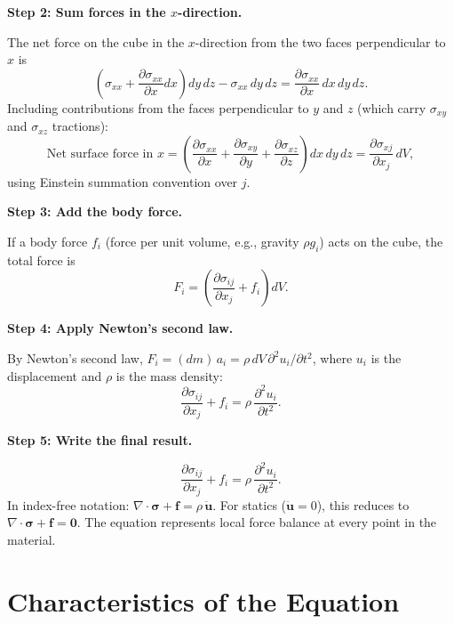 \textbf{Step 2: Sum forces in the $x$-direction.}

The net force on the cube in the $x$-direction from the two faces perpendicular to $x$ is
\begin{equation}
\left(\sigma_{xx} + \frac{\partial\sigma_{xx}}{\partial x}dx\right)dy\,dz - \sigma_{xx}\,dy\,dz = \frac{\partial\sigma_{xx}}{\partial x}\,dx\,dy\,dz.
\end{equation}
Including contributions from the faces perpendicular to $y$ and $z$ (which carry $\sigma_{xy}$ and $\sigma_{xz}$ tractions):
\begin{equation}
\text{Net surface force in }x = \left(\frac{\partial\sigma_{xx}}{\partial x} + \frac{\partial\sigma_{xy}}{\partial y} + \frac{\partial\sigma_{xz}}{\partial z}\right)dx\,dy\,dz = \frac{\partial\sigma_{xj}}{\partial x_j}\,dV,
\end{equation}
using Einstein summation convention over $j$.

\textbf{Step 3: Add the body force.}

If a body force $f_i$ (force per unit volume, e.g., gravity $\rho g_i$) acts on the cube, the total force is
\begin{equation}
F_i = \left(\frac{\partial\sigma_{ij}}{\partial x_j} + f_i\right)dV.
\end{equation}

\textbf{Step 4: Apply Newton's second law.}

By Newton's second law, $F_i = (dm)\,a_i = \rho\,dV\,\partial^2 u_i/\partial t^2$, where $u_i$ is the displacement and $\rho$ is the mass density:
\begin{equation}
\frac{\partial\sigma_{ij}}{\partial x_j} + f_i = \rho\,\frac{\partial^2 u_i}{\partial t^2}.
\end{equation}

\textbf{Step 5: Write the final result.}

\begin{equation}
\boxed{\frac{\partial\sigma_{ij}}{\partial x_j} + f_i = \rho\,\frac{\partial^2 u_i}{\partial t^2}.}
\end{equation}
In index-free notation: $\nabla\cdot\boldsymbol{\sigma} + \mathbf{f} = \rho\,\ddot{\mathbf{u}}$. For statics ($\ddot{\mathbf{u}} = 0$), this reduces to $\nabla\cdot\boldsymbol{\sigma} + \mathbf{f} = \mathbf{0}$. The equation represents local force balance at every point in the material.

\section*{Characteristics of the Equation}

